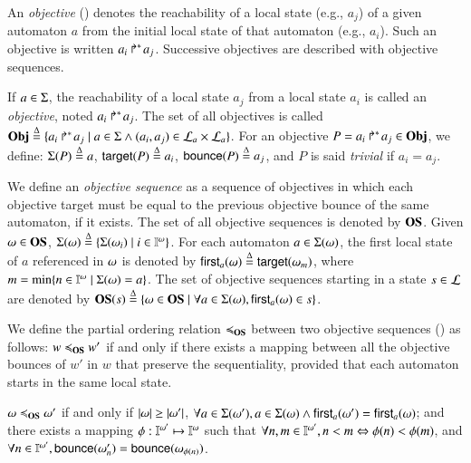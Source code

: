 An \emph{objective} () denotes the reachability of a local state (e.g., $a_j$) of a given automaton $a$
from the initial local state of that automaton (e.g., $a_i$).
Such an objective is written $\mbox{${a}_{i}\Rsh^*\!{a}_{j}$}$.
Successive objectives are described with objective sequences.

\begin{definition}
\label{def:obj}
  If $a \in \Sigma$, the reachability of a local state $a_j$ from a local state $a_i$ is called an \emph{objective}, noted $\mbox{$a_i\Rsh^*\!a_j$}$.
  The set of all objectives is called $\mathbf{Obj} \stackrel{\Delta}= \{ \mbox{$a_i\Rsh^*\!a_j$} \mid a \in \Sigma \wedge (a_i, a_j) \in \mathcal{L}_a \times \mathcal{L}_a \}$.
  For an objective $P = \mbox{$a_i\Rsh^*\!a_j$} \in \mathbf{Obj}$, we define: $\Sigma(P) \stackrel{\Delta}=
  a$, $\mathsf{target}(P)\stackrel{\Delta}= a_i$, $\mathsf{bounce}(P)\stackrel{\Delta}= a_j$,
  and $P$ is said \emph{trivial} if $a_i = a_j$.

  We define an \emph{objective sequence} as a sequence of objectives in which each objective target must be equal to the previous objective bounce of the same automaton, if it exists.
  The set of all objective sequences is denoted by $\mathbf{OS}$.
  Given $\omega\in\mathbf{OS}$, $\Sigma(\omega) \stackrel{\Delta}= \{\Sigma(\omega_i)\mid i\in\mathbb{I}^{\omega}\}$.
For each automaton $a\in\Sigma(\omega)$,  the first local state of $a$ referenced in
$\omega$ is denoted by $\mathsf{first}_a(\omega) \stackrel{\Delta}= \mathsf{target}(\omega_m)$, where $m=\min\{n\in\mathbb{I}^{\omega}\mid \Sigma(\omega)=a\}$.
  The set of objective sequences starting in a state $s\in\mathcal{L}$ are denoted by
  $\mathbf{OS}(s)\stackrel{\Delta}= \{\omega\in\mathbf{OS}\mid\forall a\in\Sigma(\omega), \mathsf{first}_a(\omega)\in s\}$.
\end{definition}


We define the partial ordering relation $\preccurlyeq_{\mathbf{OS}}$ between two objective sequences () as
follows:
$w\preccurlyeq_{\mathbf{OS}} w'$ if and only if there exists a mapping between all the objective bounces of $w'$ in $w$
that preserve the sequentiality, provided that each automaton starts in the same
local state.

\begin{definition}[$\ltw \subset \OS\times\OS$]\label{def:ltw}
$\omega\preccurlyeq_{\mathbf{OS}}\omega'$ if and only if
$|\omega|\geq|\omega'|$,
$\forall a\in\Sigma(\omega'), a\in\Sigma(\omega) \wedge \mathsf{first}_a(\omega')=\mathsf{first}_a(\omega)$;
and there exists a mapping $\phi: \mathbb{I}^{\omega'}\mapsto \mathbb{I}^{\omega}$ such that
$\forall n,m \in\mathbb{I}^{\omega'}, n<m \Leftrightarrow \phi(n)<\phi(m)$,
and
$\forall n\in\mathbb{I}^{\omega'}, \mathsf{bounce}(\omega'_n)=\mathsf{bounce}(\omega_{\phi(n)})$.
\end{definition}

